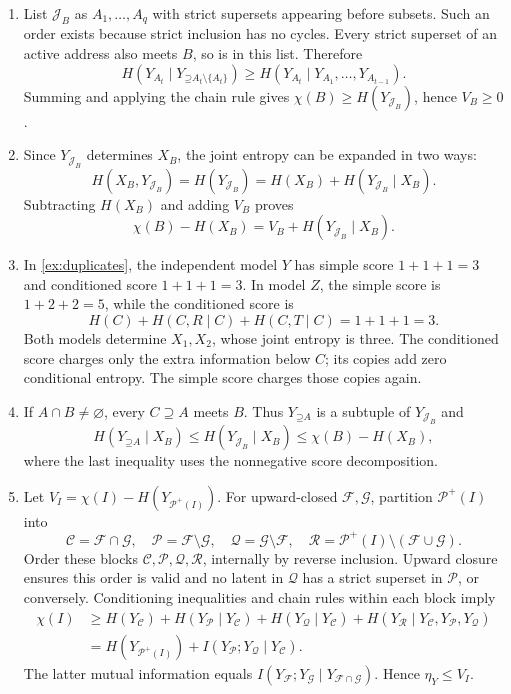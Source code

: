 \documentclass[11pt]{article}
\newcommand{\PI}{\mathcal{P}^{+}(I)}
\newcommand{\Up}{\mathord{\supseteq}}
\begin{document}
\begin{solution}[ex:scores]
\begin{enumerate}
\item List $\mathcal{J}_B$ as $A_1,\ldots,A_q$ with strict supersets appearing
before subsets. Such an order exists because strict inclusion has no cycles.
Every strict superset of an active address also meets $B$, so is in this list.
Therefore
\[
 H(Y_{A_t}\mid Y_{\Up A_t\setminus\{A_t\}})
 \ge H(Y_{A_t}\mid Y_{A_1},\ldots,Y_{A_{t-1}}).
\]
Summing and applying the chain rule gives
$\chi(B)\ge H(Y_{\mathcal{J}_B})$, hence $V_B\ge0$.
\item Since $Y_{\mathcal{J}_B}$ determines $X_B$, the joint entropy can be
expanded in two ways:
\[
 H(X_B,Y_{\mathcal{J}_B})=H(Y_{\mathcal{J}_B})
 =H(X_B)+H(Y_{\mathcal{J}_B}\mid X_B).
\]
Subtracting $H(X_B)$ and adding $V_B$ proves
\[
 \chi(B)-H(X_B)=V_B+H(Y_{\mathcal{J}_B}\mid X_B).
\]
\item In \cref{ex:duplicates}, the independent model $Y$ has simple score $1+1+1=3$ and
conditioned score $1+1+1=3$. In model $Z$, the simple score is $1+2+2=5$,
while the conditioned score is
\[
 H(C)+H(C,R\mid C)+H(C,T\mid C)=1+1+1=3.
\]
Both models determine $X_1,X_2$, whose joint entropy is three. The conditioned
score charges only the extra information below $C$; its copies add zero
conditional entropy. The simple score charges those copies again.
\item If $A\cap B\ne\varnothing$, every $C\supseteq A$ meets $B$.
Thus $Y_{\Up A}$ is a subtuple of $Y_{\mathcal{J}_B}$ and
\[
 H(Y_{\Up A}\mid X_B)
 \le H(Y_{\mathcal{J}_B}\mid X_B)
 \le\chi(B)-H(X_B),
\]
where the last inequality uses the nonnegative score decomposition.
\item Let $V_I=\chi(I)-H(Y_{\PI})$. For upward-closed $\mathcal{F},\mathcal{G}$,
partition $\PI$ into
\[
 \mathcal{C}=\mathcal{F}\cap\mathcal{G},\quad
 \mathcal{P}=\mathcal{F}\setminus\mathcal{G},\quad
 \mathcal{Q}=\mathcal{G}\setminus\mathcal{F},\quad
 \mathcal{R}=\PI\setminus(\mathcal{F}\cup\mathcal{G}).
\]
Order these blocks $\mathcal{C},\mathcal{P},\mathcal{Q},\mathcal{R}$, internally
by reverse inclusion. Upward closure ensures this order is valid and no latent
in $\mathcal{Q}$ has a strict superset in $\mathcal{P}$, or conversely.
Conditioning inequalities and chain rules within each block imply
\begin{align*}
 \chi(I)&\ge H(Y_{\mathcal{C}})+H(Y_{\mathcal{P}}\mid Y_{\mathcal{C}})
 +H(Y_{\mathcal{Q}}\mid Y_{\mathcal{C}})
 +H(Y_{\mathcal{R}}\mid Y_{\mathcal{C}},Y_{\mathcal{P}},Y_{\mathcal{Q}})\\
 &=H(Y_{\PI})+I(Y_{\mathcal{P}};Y_{\mathcal{Q}}\mid Y_{\mathcal{C}}).
\end{align*}
The latter mutual information equals
$I(Y_{\mathcal{F}};Y_{\mathcal{G}}\mid Y_{\mathcal{F}\cap\mathcal{G}})$.
Hence $\eta_Y\le V_I$.


\end{enumerate}
\end{solution}
\end{document}
